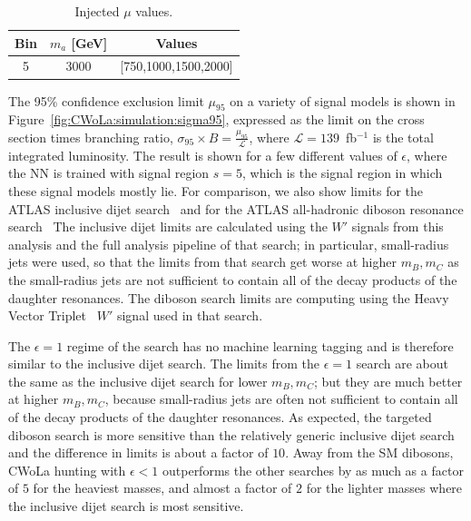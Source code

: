 \begin{table}[htb]
  \centering
  \caption{Injected $\mu$ values.}
  \label{tab:MC:injectedmu}
  \begin{tabular}{c c c}
    \hline
    Bin & $m_a$ [GeV] & Values \\ \hline
    5 & 3000 & [750,1000,1500,2000] \\
    \hline
  \end{tabular}
\end{table} 



The 95\% confidence exclusion limit $\mu_{95}$ on a variety of signal models is shown in Figure~\ref{fig:CWoLa:simulation:sigma95}, expressed as the limit on the cross section times branching ratio, $\sigma_{95}\times B = \frac{\mu_{95}}{\mathcal{L}}$, where $\mathcal{L} = 139$~fb$^{-1}$ is the total integrated luminosity.
The result is shown for a few different values of $\epsilon$, where the NN is trained with signal region $s=5$, which is the signal region in which these signal models mostly lie.
For comparison, we also show limits for the ATLAS inclusive dijet search~\cite{Aad:2019hjw} and for the ATLAS all-hadronic diboson resonance search~\cite{Aad:2019fbh}
The inclusive dijet limits are calculated using the $W'$ signals from this analysis and the full analysis pipeline of that search;
in particular, small-radius jets were used, so that the limits from that search get worse at higher $m_B,m_C$ as the small-radius jets are not sufficient to contain all of the decay products of the daughter resonances.
The diboson search limits are computing using the Heavy Vector Triplet~\cite{Pappadopulo:2014qza} $W'$ signal used in that search.

The $\epsilon=1$ regime of the search has no machine learning tagging and is therefore similar to the inclusive dijet search.
The limits from the $\epsilon=1$ search are about the same as the inclusive dijet search for lower $m_B,m_C$; but they are much better at higher $m_B,m_C$, because small-radius jets are often not sufficient to contain all of the decay products of the daughter resonances.
As expected, the targeted diboson search is more sensitive than the relatively generic inclusive dijet search and the difference in limits is about a factor of $10$.
Away from the SM dibosons, CWoLa hunting with $\epsilon<1$ outperforms the other searches by as much as a factor of $5$ for the heaviest masses, and almost a factor of $2$ for the lighter masses where the inclusive dijet search is most sensitive.

